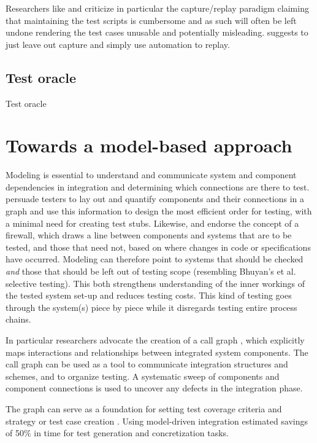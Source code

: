 \documentclass[12pt,a4paper,oneside,pdftex]{report}
\begin{document}
{{Researchers like \citet{zallar2001you} and \citet{kit1999integrated} criticize in particular the capture/replay paradigm claiming that maintaining the test scripts is cumbersome and as such will often be left undone rendering the test cases unusable and potentially misleading. \citet{kit1999integrated} suggests to just leave out capture and simply use automation to replay.

\subsection{Test oracle}

Test oracle

\section{Towards a model-based approach}

Modeling is essential to understand and communicate system and component dependencies in integration and determining which connections are there to test. \citet{hewett2009automated} persuade testers to lay out and quantify components and their connections in a graph and use this information to design the most efficient order for testing, with a minimal need for creating test stubs. Likewise, \citet{leung1990study} and \citet{abdullah1995correcting} endorse the concept of a firewall, which draws a line between components and systems that are to be tested, and those that need not, based on where changes in code or specifications have occurred. Modeling can therefore point to systems that should be checked \textit{and} those that should be left out of testing scope (resembling Bhuyan's et al. selective testing). This both strengthens understanding of the inner workings of the tested system set-up and reduces testing costs. This kind of testing goes through the system(s) piece by piece while it disregards testing entire process chains.
 
In particular researchers advocate the creation of a call graph \citep{leung1990study, hurlburt2012not, linnenkugel1990test}, which explicitly maps interactions and relationships between integrated system components. The call graph can be used as a tool to communicate integration structures and schemes, and to organize testing. A systematic sweep of components and component connections is used to uncover any defects in the integration phase. 

The graph can serve as a foundation for setting test coverage criteria and strategy or test case creation 
\citep{benz2007combining, hura2011method, linnenkugel1990test}. Using model-driven integration \citet{wieczorek2010model} estimated savings of 50\% in time for test generation and concretization tasks.



}}
\end{document}

